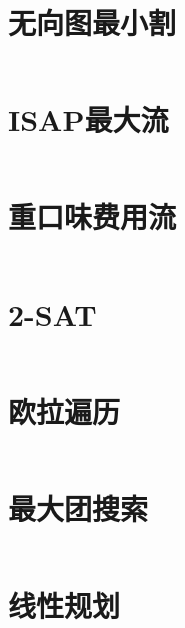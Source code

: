 \section{无向图最小割}
\inputminted{cpp}{\source/graph-theory/stoer-wagner-algorithm.cpp}
\section{ISAP最大流}
\inputminted{cpp}{\source/graph-theory/max_flow_ISAP.cpp}
\section{重口味费用流}
\inputminted{cpp}{\source/graph-theory/zkw-cost-flow.cpp}
\section{2-SAT}
\inputminted{cpp}{\source/graph-theory/2-satisfiability.cpp}
\section{欧拉遍历}
\inputminted{cpp}{\source/graph-theory/euler_tour.cpp}
\section{最大团搜索}
\inputminted{cpp}{\source/graph-theory/最大团搜索.cpp}
\section{线性规划}
\inputminted{cpp}{\source/graph-theory/liner_sieve.cpp}

